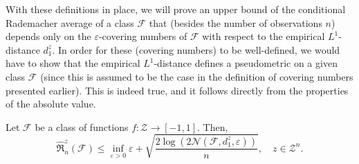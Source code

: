 With these definitions in place, we will prove an upper bound of the conditional Rademacher average of a class $\mathcal{F}$ that (besides the number of observations $n$) depends only on the $\varepsilon$-covering numbers of $\mathcal{F}$ with respect to the empirical $L^1$-distance $d_1^z$. In order for these (covering numbers) to be well-defined, we would have to show that the empirical $L^1$-distance defines a pseudometric on a given class $\mathcal{F}$ (since this is assumed to be the case in the definition of covering numbers presented earlier). This is indeed true, and it follows directly from the properties of the absolute value.

\begin{theorem}
\label{thm: bound on conditional rademacher average}
Let $\mathcal{F}$ be a class of functions $f \colon \mathcal{Z} \to [-1, 1]$. Then,
\[
    \hat{\mathfrak{R}}_n^z(\mathcal{F}) \leq \inf_{\varepsilon > 0} \varepsilon + \sqrt{\frac{2 \log(2 \mathcal{N}(\mathcal{F}, d_1^z, \varepsilon))}{n}}, \quad z \in \mathcal{Z}^n.
\]
\end{theorem}

